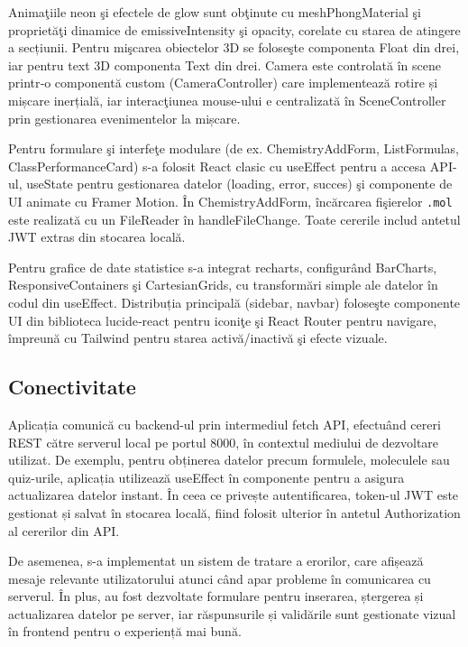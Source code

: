 Animaţiile neon şi efectele de glow sunt obţinute cu meshPhongMaterial 
şi proprietăţi dinamice de emissiveIntensity şi opacity,
corelate cu starea de atingere a secțiunii. Pentru mişcarea obiectelor 3D se foloseşte
componenta Float din drei, iar pentru text 3D componenta Text din drei.
Camera este controlată în scene printr‐o componentă
custom (CameraController) care implementează rotire și mișcare inerțială,
iar interacţiunea mouse-ului e centralizată în SceneController prin gestionarea 
evenimentelor la mișcare.

Pentru formulare şi interfeţe modulare (de ex. ChemistryAddForm,
ListFormulas, ClassPerformanceCard) s-a folosit React clasic 
cu useEffect pentru a accesa API-ul, useState pentru gestionarea 
datelor (loading, error, succes) şi componente de UI animate cu Framer Motion.
În ChemistryAddForm, încărcarea fişierelor \texttt{.mol} este realizată cu un FileReader în
handleFileChange. Toate cererile includ antetul JWT extras din stocarea locală.

Pentru grafice de date statistice s-a integrat recharts, configurând
BarCharts, ResponsiveContainers şi CartesianGrids, 
cu transformări simple ale datelor în codul din useEffect. 
Distribuția principală (sidebar, navbar) foloseşte componente UI din biblioteca lucide‐react
pentru iconiţe şi React Router pentru navigare, împreună cu Tailwind pentru
starea activă/inactivă şi efecte vizuale.

\subsection{Conectivitate}
\label{subsec:conectivitate-frontend}

Aplicația comunică cu backend-ul prin intermediul fetch API, efectuând cereri REST
către serverul local pe portul 8000, în contextul mediului de dezvoltare utilizat.
De exemplu, pentru obținerea datelor precum formulele, moleculele sau quiz-urile, aplicația
utilizează useEffect în componente pentru a asigura 
actualizarea datelor instant. În ceea ce privește autentificarea, token-ul
JWT este gestionat și salvat în stocarea locală, fiind folosit ulterior 
în antetul Authorization al cererilor din API.

De asemenea, s-a implementat un sistem de tratare a erorilor, care afișează mesaje 
relevante utilizatorului atunci când apar probleme în comunicarea cu serverul. În
plus, au fost dezvoltate formulare pentru inserarea, ștergerea și actualizarea 
datelor pe server, iar răspunsurile și validările sunt gestionate vizual în frontend
pentru o experiență mai bună.


